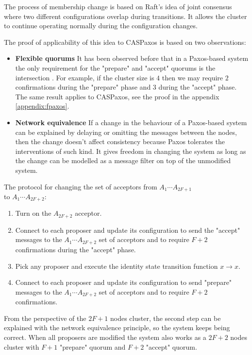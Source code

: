 \documentclass[12pt]{article}
\theoremstyle{definition}
\begin{document}
The process of membership change is based on Raft's idea of joint consensus where two different configurations overlap during transitions. It allows the cluster to continue operating normally during the configuration changes.

The proof of applicability of this idea to CASPaxos is based on two observations:

\begin{itemize}
  \item {\bf Flexible quorums} It has been observed before that in a Paxos-based system the only requirement for the "prepare" and "accept" quorums is the intersection \cite{abcds}\cite{vertical}\cite{fpaxos}. For example, if the cluster size is $4$ then we may require $2$ confirmations during the "prepare" phase and $3$ during the "accept" phase. The same result applies to CASPaxos, see the proof in the appendix \ref{appendix:fpaxos}.
  
  \item {\bf Network equivalence} If a change in the behaviour of a Paxos-based system can be explained by delaying or omitting the messages between the nodes, then the change doesn't affect consistency because Paxos tolerates the interventions of such kind. It gives freedom in changing the system as long as the change can be modelled as a message filter on top of the unmodified system.
\end{itemize}

The protocol for changing the set of acceptors from $A_1 \cdots A_{2F+1}$ \\
to $A_1 \cdots A_{2F+2}$:
\begin{enumerate}
  \item Turn on the $A_{2F+2}$ acceptor.
  \item Connect to each proposer and update its configuration to send the "accept" messages to the $A_1 \cdots A_{2F+2}$ set of acceptors and to require $F+2$ confirmations during the "accept" phase.
  \item Pick any proposer and execute the identity state transition function $x \to x$.
  \item Connect to each proposer and update its configuration to send "prepare" messages to the $A_1 \cdots A_{2F+2}$ set of acceptors and to require $F+2$ confirmations.
\end{enumerate}

From the perspective of the $2F+1$ nodes cluster, the second step can be explained with the network equivalence principle, so the system keeps being correct. When all proposers are modified the system also works as a $2F+2$ nodes cluster with $F+1$ "prepare" quorum and $F+2$ "accept" quorum.
\end{document}

